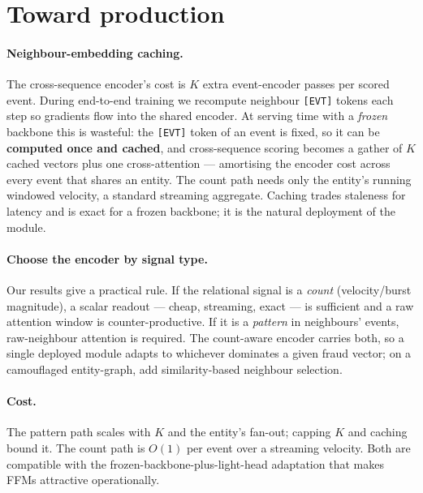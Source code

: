 \section{Toward production}
\label{sec:productization}

\paragraph{Neighbour-embedding caching.} The cross-sequence encoder's cost is $K$ extra
event-encoder passes per scored event. During end-to-end training we recompute neighbour
\texttt{[EVT]} tokens each step so gradients flow into the shared encoder. At serving time with a
\emph{frozen} backbone this is wasteful: the \texttt{[EVT]} token of an event is fixed, so it can be
\textbf{computed once and cached}, and cross-sequence scoring becomes a gather of $K$ cached vectors
plus one cross-attention --- amortising the encoder cost across every event that shares an entity.
The count path needs only the entity's running windowed velocity, a standard streaming aggregate.
Caching trades staleness for latency and is exact for a frozen backbone; it is the natural
deployment of the module.

\paragraph{Choose the encoder by signal type.} Our results give a practical rule. If the relational
signal is a \emph{count} (velocity/burst magnitude), a scalar readout --- cheap, streaming, exact
--- is sufficient and a raw attention window is counter-productive. If it is a \emph{pattern} in
neighbours' events, raw-neighbour attention is required. The count-aware encoder carries both, so a
single deployed module adapts to whichever dominates a given fraud vector; on a camouflaged
entity-graph, add similarity-based neighbour selection.

\paragraph{Cost.} The pattern path scales with $K$ and the entity's fan-out; capping $K$ and caching
bound it. The count path is $O(1)$ per event over a streaming velocity. Both are compatible with the
frozen-backbone-plus-light-head adaptation that makes FFMs attractive operationally.

